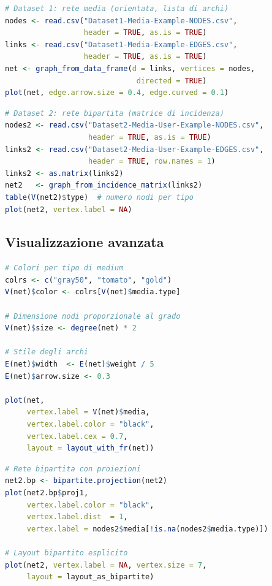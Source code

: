 \documentclass[12pt,a4paper]{article}
\begin{document}
\begin{lstlisting}[language=R]
# Dataset 1: rete media (orientata, lista di archi)
nodes <- read.csv("Dataset1-Media-Example-NODES.csv",
                  header = TRUE, as.is = TRUE)
links <- read.csv("Dataset1-Media-Example-EDGES.csv",
                  header = TRUE, as.is = TRUE)
net <- graph_from_data_frame(d = links, vertices = nodes,
                              directed = TRUE)
plot(net, edge.arrow.size = 0.4, edge.curved = 0.1)
\end{lstlisting}

\begin{lstlisting}[language=R]
# Dataset 2: rete bipartita (matrice di incidenza)
nodes2 <- read.csv("Dataset2-Media-User-Example-NODES.csv",
                   header = TRUE, as.is = TRUE)
links2 <- read.csv("Dataset2-Media-User-Example-EDGES.csv",
                   header = TRUE, row.names = 1)
links2 <- as.matrix(links2)
net2   <- graph_from_incidence_matrix(links2)
table(V(net2)$type)  # numero nodi per tipo
plot(net2, vertex.label = NA)
\end{lstlisting}

\subsection{Visualizzazione avanzata}

\begin{lstlisting}[language=R]
# Colori per tipo di medium
colrs <- c("gray50", "tomato", "gold")
V(net)$color <- colrs[V(net)$media.type]

# Dimensione nodi proporzionale al grado
V(net)$size <- degree(net) * 2

# Stile degli archi
E(net)$width  <- E(net)$weight / 5
E(net)$arrow.size <- 0.3

plot(net,
     vertex.label = V(net)$media,
     vertex.label.color = "black",
     vertex.label.cex = 0.7,
     layout = layout_with_fr(net))
\end{lstlisting}

\begin{lstlisting}[language=R]
# Rete bipartita con proiezioni
net2.bp <- bipartite.projection(net2)
plot(net2.bp$proj1,
     vertex.label.color = "black",
     vertex.label.dist  = 1,
     vertex.label = nodes2$media[!is.na(nodes2$media.type)])

# Layout bipartito esplicito
plot(net2, vertex.label = NA, vertex.size = 7,
     layout = layout_as_bipartite)
\end{lstlisting}
\end{document}
